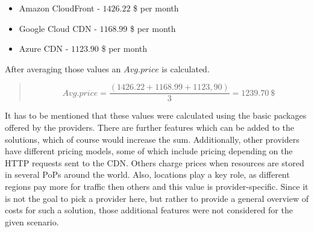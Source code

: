 \begin{itemize}[noitemsep]
	\item Amazon CloudFront - $1426.22$ \$ per month
	\item Google Cloud CDN - $1168.99$ \$ per month
	\item Azure CDN - $1123.90$ \$ per month
\end{itemize} 

After averaging those values an $Avg. price$ is calculated.  

\begin{quote}
	\begin{center}
		\begin{equation*}
			Avg. price = 
			\frac{
				\left(1426.22 + 1168.99 + 1123,90\right)
			}{
				3
			} = 1239.70 \: \$
		\end{equation*}
	\end{center} 
\end{quote}

It has to be mentioned that these values were calculated using the basic packages offered by the providers. There are further features which can be added to the solutions, which of course would increase the sum. Additionally, other providers have different pricing models, some of which include pricing depending on the HTTP requests sent to the CDN. Others charge prices when resources are stored in several PoPs around the world. Also, locations play a key role, as different regions pay more for traffic then others and this value is provider-specific.
Since it is not the goal to pick a provider here, but rather to provide a general overview of costs for such a solution, those additional features were not considered for the given scenario.



